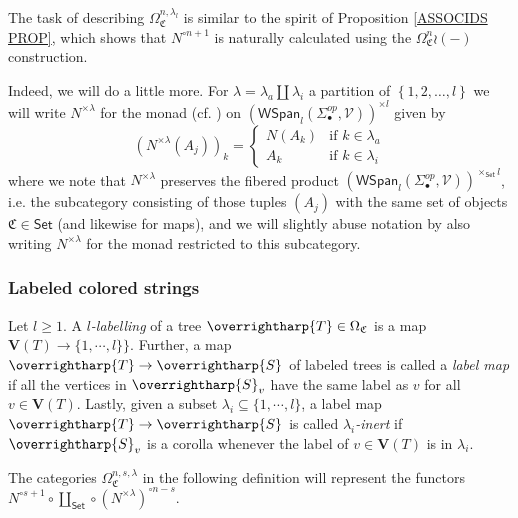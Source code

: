 \documentclass[a4paper,10pt
,draft
]{article}%
\numberwithin{equation}{section}
\numberwithin{figure}{section}
\theoremstyle{definition} %
\newcommand{\set}[1]{\left\{#1\right\}}%
\newcommand{\vect}[1]{\text{\overrightharp{\ensuremath{#1}}}}
\newcommand{\1}{\ensuremath{\mathbbm 1}}%
\begin{document}
The task of describing 
$\Omega^{n,\lambda_l}_{\mathfrak{C}}$
is similar to the spirit of Proposition \ref{ASSOCIDS PROP}, which shows that
$N^{\circ n+1}$ is naturally calculated using the
$\Omega_{\mathfrak{C}}^{n} \wr (-)$ 
construction.


Indeed, we will do a little more. For $\lambda = \lambda_a \amalg \lambda_i$
a partition of $\set{1,2,\dots,l}$
we will write 
$N^{\times \lambda}$
for the monad (cf. \cite[\S 2.3]{BP_geo}) on 
$\left(\mathsf{WSpan}_l(\Sigma_{\bullet}^{op},\mathcal{V})\right)^{\times l}$
given by
\[
\left(N^{\times \lambda} (A_j)\right)_k = 
\begin{cases}
N(A_k) & \text{if } k\in \lambda_a
\\
A_k & \text{if } k\in \lambda_i
\end{cases}
\]
where we note that $N^{\times \lambda}$
preserves the fibered product
$\left(\mathsf{WSpan}_l(\Sigma_{\bullet}^{op},\mathcal{V})\right)^{\times_{\mathsf{Set}} l}$,
i.e. the subcategory consisting of those tuples $(A_j)$ with the same set of objects $\mathfrak{C} \in \mathsf{Set}$ (and likewise for maps), and we will slightly abuse notation by also writing 
$N^{\times \lambda}$
for the monad restricted to this subcategory.



\subsubsection*{Labeled colored strings}
\label{LCS_SEC}

Let $l \geq 1$. A \emph{$l$-labelling} of a tree $\vect{T} \in \Omega_{\mathfrak{C}}$ is a map
$\boldsymbol{V}(T) \to \{1,\cdots,l\}\}$.
Further, a map 
$\vect{T} \to \vect{S}$ of labeled trees
is called a \emph{label map}
if all the vertices in $\vect{S}_v$
have the same label as $v$
for all $v \in \boldsymbol{V}(T)$.
Lastly, given a subset $\lambda_i \subseteq \{1,\cdots,l\}$,
a label map 
$\vect{T} \to \vect{S}$
is called \emph{$\lambda_i$-inert}
if $\vect{S}_v$ is a corolla whenever the label of
$v \in \boldsymbol{V}(T)$ is in $\lambda_i$.

 

The categories $\Omega_{\mathfrak C}^{n,s,\lambda}$ in the following definition will represent
the functors
$N^{\circ s+1} \circ \coprod_{\mathsf{Set}} \circ \left(N^{\times \lambda}\right)^{\circ n-s}$.
\end{document}
